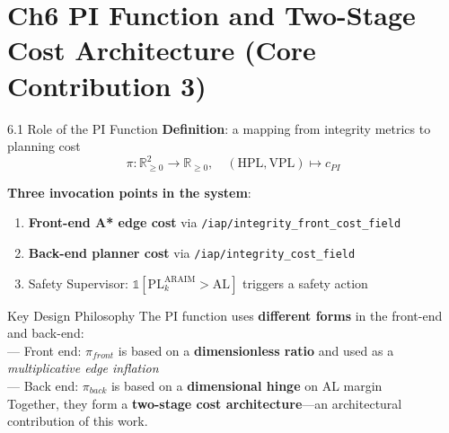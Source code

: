 \documentclass[10pt,aspectratio=169,xcolor=dvipsnames]{beamer}
\newcommand{\PL}{\mathrm{PL}}
\newcommand{\HPL}{\mathrm{HPL}}
\newcommand{\VPL}{\mathrm{VPL}}
\newcommand{\1}{\mathbb{1}}
\newcommand{\R}{\mathbb{R}}
\newcommand{\innov}[1]{\textcolor{NavyBlue}{\textbf{#1}}}
\begin{document}
\section{Ch6 PI Function and Two-Stage Cost Architecture (Core Contribution 3)}

\begin{frame}{6.1 Role of the PI Function}
  \small
  \textbf{Definition}: a mapping from integrity metrics to planning cost
  \[
    \pi:\R_{\ge 0}^2\to\R_{\ge 0},\quad(\HPL,\VPL)\mapsto c_{PI}
  \]

  \medskip
  \textbf{Three invocation points in the system}:
  \begin{enumerate}\small
    \item \innov{Front-end A* edge cost} via \texttt{/iap/integrity\_front\_cost\_field}
    \item \innov{Back-end planner cost} via \texttt{/iap/integrity\_cost\_field}
    \item Safety Supervisor: $\1[\PL_k^{\mathrm{ARAIM}}>\mathrm{AL}]$ triggers a safety action
  \end{enumerate}

  \medskip
  \begin{alertblock}{\small Key Design Philosophy}
    \small The PI function uses \textbf{different forms} in the front-end and back-end:\\
    --- Front end: \(\pi_{front}\) is based on a \textbf{dimensionless ratio} and used as a \emph{multiplicative edge inflation}\\
    --- Back end: \(\pi_{back}\) is based on a \textbf{dimensional hinge} on AL margin\\
    Together, they form a \innov{two-stage cost architecture}---an architectural contribution of this work.
  \end{alertblock}
\end{frame}
\end{document}
